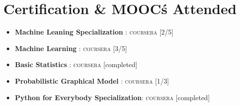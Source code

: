 \documentclass[letterpaper,11pt]{article}
\newcommand{\resumeItem}[2]{
	\item\small{
		\textbf{#1}{: #2 \vspace{-2pt}}
	}
}
\newcommand{\resumeSubItem}[2]{\resumeItem{#1}{#2}\vspace{-4pt}}
\newcommand{\resumeSubHeadingListStart}{\begin{itemize}[leftmargin=*]}
\newcommand{\resumeSubHeadingListEnd}{\end{itemize}}
\begin{document}
	\section{Certification \& MOOC\' s Attended}
	
	\resumeSubHeadingListStart
	\resumeSubItem{Machine Leaning Specialization } \hfill \textsc{coursera} [2/5]
	\resumeSubItem{Machine Learning } \hfill\textsc{coursera} [3/5]
	\resumeSubItem{Basic Statistics } \hfill\textsc{coursera} [completed]
	\resumeSubItem{Probabilistic Graphical Model } \hfill\textsc{coursera} [1/3]
	\resumeSubItem{Python for Everybody Specialization} \hfill\textsc{coursera} [completed]
	
	\resumeSubHeadingListEnd
	
\end{document}
